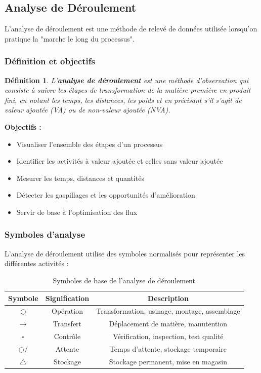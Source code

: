 \documentclass[a4paper,12pt]{article}
\newtheorem{definition}{Définition}[section]
\begin{document}
\subsection{Analyse de Déroulement}

L'analyse de déroulement est une méthode de relevé de données utilisée lorsqu'on pratique la "marche le long du processus".

\subsubsection{Définition et objectifs}

\begin{definition}
L'\textbf{analyse de déroulement} est une méthode d'observation qui consiste à suivre les étapes de transformation de la matière première en produit fini, en notant les temps, les distances, les poids et en précisant s'il s'agit de valeur ajoutée (VA) ou de non-valeur ajoutée (NVA).
\end{definition}

\textbf{Objectifs :}
\begin{itemize}
    \item Visualiser l'ensemble des étapes d'un processus
    \item Identifier les activités à valeur ajoutée et celles sans valeur ajoutée
    \item Mesurer les temps, distances et quantités
    \item Détecter les gaspillages et les opportunités d'amélioration
    \item Servir de base à l'optimisation des flux
\end{itemize}

\subsubsection{Symboles d'analyse}

L'analyse de déroulement utilise des symboles normalisés pour représenter les différentes activités :

\begin{table}[ht]
\centering
\begin{tabular}{|c|c|c|}
\hline
\textbf{Symbole} & \textbf{Signification} & \textbf{Description} \\
\hline
$\bigcirc$ & Opération & Transformation, usinage, montage, assemblage \\
$\rightarrow$ & Transfert & Déplacement de matière, manutention \\
$\square$ & Contrôle & Vérification, inspection, test qualité \\
$\bigcirc\!\!\!/$ & Attente & Temps d'attente, stockage temporaire \\
$\bigtriangleup$ & Stockage & Stockage permanent, mise en magasin \\
\hline
\end{tabular}
\caption{Symboles de base de l'analyse de déroulement}
\end{table}
\end{document}
